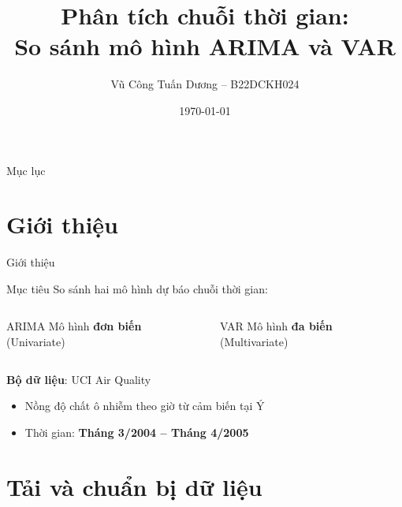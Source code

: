 \documentclass[serif, aspectratio=169]{beamer}
\author{Vũ Công Tuấn Dương -- B22DCKH024}
\title{Phân tích chuỗi thời gian:\\So sánh mô hình ARIMA và VAR}
\institute{Khoa CNTT1 -- PTIT}
\date{\small \today}
\newcommand{\highlight}[1]{\textbf{\color{hkustblue}#1}}
\begin{document}
\begin{frame}
    \titlepage
\end{frame}

\begin{frame}{Mục lục}
    \tableofcontents
\end{frame}

\section{Giới thiệu}

\begin{frame}{Giới thiệu}
    \begin{block}{Mục tiêu}
        So sánh hai mô hình dự báo chuỗi thời gian:
    \end{block}
    
    \vspace{0.3cm}
    \begin{columns}
        \begin{block}{ARIMA}
            Mô hình \highlight{đơn biến} (Univariate)
        \end{block}
        
        \begin{block}{VAR}
            Mô hình \highlight{đa biến} (Multivariate)
        \end{block}
    \end{columns}
    
    \vspace{0.5cm}
    \textbf{Bộ dữ liệu}: UCI Air Quality
    \begin{itemize}
        \item Nồng độ chất ô nhiễm theo giờ từ cảm biến tại Ý
        \item Thời gian: \highlight{Tháng 3/2004 -- Tháng 4/2005}
    \end{itemize}
\end{frame}

\section{Tải và chuẩn bị dữ liệu}
\end{document}
